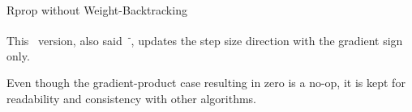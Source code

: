 \begin{subsection}{Rprop without Weight-Backtracking}
    \par This~ version, also said~\textsuperscript{-}, updates the step size direction with the gradient sign only.
    \par Even though the gradient-product case resulting in zero is a no-op, it is kept for readability and consistency with other algorithms.
    
    \clearpage
\end{subsection}